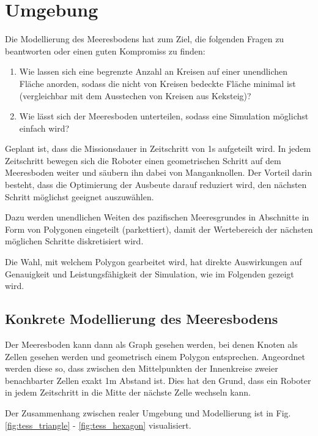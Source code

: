 \documentclass{article}
\begin{document}
\clearpage
\section{Umgebung}

Die Modellierung des Meeresbodens hat zum Ziel, die folgenden 
Fragen zu beantworten oder einen guten Kompromiss zu finden:

\begin{enumerate}
\item Wie lassen sich eine begrenzte Anzahl an Kreisen auf einer 
unendlichen Fläche anorden, sodass die nicht von Kreisen bedeckte Fläche minimal 
ist (vergleichbar mit dem Ausstechen von Kreisen aus Keksteig)?
\item Wie lässt sich der Meeresboden unterteilen, sodass eine Simulation
möglichst einfach wird?
\end{enumerate}

Geplant ist, dass die Missionsdauer in Zeitschritt von 1s aufgeteilt wird.
In jedem Zeitschritt bewegen sich die Roboter einen geometrischen Schritt
auf dem Meeresboden weiter und säubern ihn dabei von Manganknollen. Der Vorteil
darin besteht, dass die Optimierung der Ausbeute darauf reduziert wird, 
den nächsten Schritt möglichst geeignet auszuwählen.

Dazu werden unendlichen Weiten des pazifischen Meeresgrundes
in Abschnitte in Form von Polygonen eingeteilt (parkettiert),
damit der Wertebereich der nächsten möglichen Schritte diskretisiert wird.

Die Wahl, mit welchem Polygon gearbeitet wird, hat direkte
Auswirkungen auf Genauigkeit und Leistungsfähigkeit der 
Simulation, wie im Folgenden gezeigt wird.

\subsection{Konkrete Modellierung des Meeresbodens}

Der Meeresboden kann dann als Graph gesehen werden, bei denen Knoten 
als Zellen gesehen werden und geometrisch einem Polygon entsprechen. 
Angeordnet werden diese so, dass zwischen den Mittelpunkten der Innenkreise
zweier benachbarter Zellen exakt 1m Abstand ist. Dies hat den Grund, dass 
ein Roboter in jedem Zeitschritt in die Mitte der nächste Zelle wechseln kann.

Der Zusammenhang zwischen realer Umgebung und Modellierung ist in
Fig. \ref{fig:tess_triangle} - \ref{fig:tess_hexagon} visualisiert.
\end{document}

